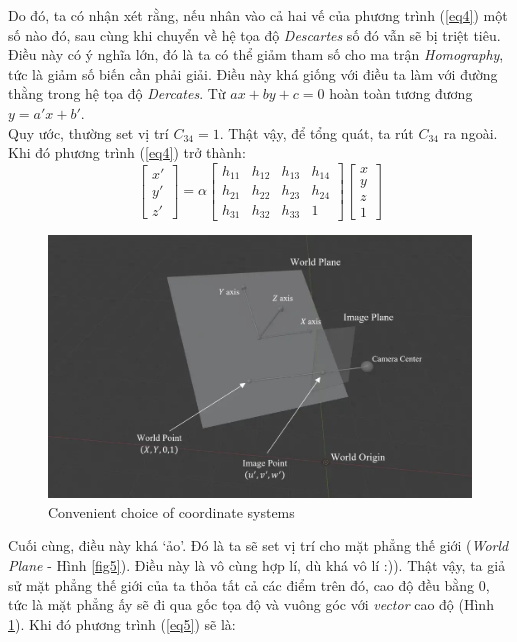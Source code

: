 \documentclass{article}
\begin{document}
Do đó, ta có nhận xét rằng, nếu nhân vào cả hai vế của phương trình (\ref{eq4}) một số nào đó, sau cùng khi chuyển về hệ tọa độ \textit{Descartes} số đó vẫn sẽ bị triệt tiêu. Điều này có ý nghĩa lớn, đó là ta có thể giảm tham số cho ma trận \textit{Homography}, tức là giảm số biến cần phải giải. Điều này khá giống với điều ta làm với đường thằng trong hệ tọa độ \textit{Dercates}. Từ $ax+by+c =0$ hoàn toàn tương đương $y = a'x+b'$.\\
Quy ước, thường set vị trí $C_{34} = 1$. Thật vậy, để tổng quát, ta rút $C_{34}$ ra ngoài. Khi đó phương trình (\ref{eq4}) trở thành:
\begin{equation}
\begin{bmatrix}
    x'\\y'\\z'
\end{bmatrix} = \alpha \begin{bmatrix}
    h_{11}&h_{12}&h_{13}&h_{14}\\
    h_{21}&h_{22}&h_{23}&h_{24}\\
    h_{31}&h_{32}&h_{33}&1
\end{bmatrix}\begin{bmatrix}
    x\\y\\z\\1
\end{bmatrix}
\label{eq5}
\end{equation}
\begin{figure}[ht!]
    \centering
    \includegraphics[width = 0.8\linewidth]{fig7.jpg}
    \caption{Convenient choice of coordinate systems}
    \label{fig7}
\end{figure}
Cuối cùng, điều này khá `ảo'. Đó là ta sẽ set vị trí cho mặt phẳng thế giới (\textit{World Plane} - Hình \ref{fig5}). Điều này là vô cùng hợp lí, dù khá vô lí :)). Thật vậy, ta giả sử mặt phẳng thế giới của ta thỏa tất cả các điểm trên đó, cao độ đều bằng 0, tức là mặt phẳng ấy sẽ đi qua gốc tọa độ và vuông góc với \textit{vector} cao độ (Hình \ref{fig7}). Khi đó phương trình (\ref{eq5}) sẽ là:
\end{document}
